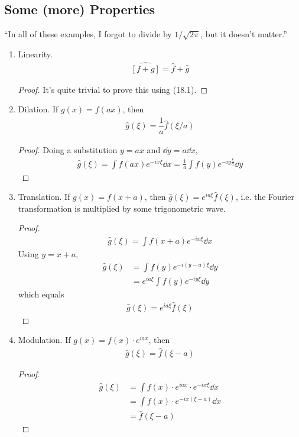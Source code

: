 \subsection{Some (more) Properties}
``In all of these examples, I forgot to divide by $1/\sqrt{2\pi}$, but it doesn't matter.''
\begin{enumerate}
    \item Linearity.
    \begin{align}
        \widehat{\left[f + g\right]} = \widehat{f} + \widehat{g}
    \end{align}
    \begin{proof}
        It's quite trivial to prove this using (18.1).
    \end{proof}
    \item Dilation. If $g(x) = f(ax)$, then
    \begin{align}
        \hat{g}(\xi) = \dfrac{1}{a} \hat{f}(\xi/a)
    \end{align}
    \begin{proof}
        Doing a substitution $y = ax$ and $\dd{y} = a\dd{x}$,
        \begin{align}
            \hat{g}(\xi) = \int f(ax) e^{-ix \xi} \dd{x} = \frac{1}{a}\int f(y) e^{-iy \frac{\xi}{a}} \dd{y}
        \end{align}
    \end{proof}
    \item Translation. If $g(x) = f(x+a)$, then $\hat{g}(\xi) = e^{ia\xi} \hat{f}(\xi)$, i.e. the Fourier transformation is multiplied by some trigonometric wave.
    \begin{proof}
        \begin{align}
            \hat{g}(\xi) = \int f(x+a) e^{-ix \xi} \dd{x}
        \end{align}
        Using $y = x + a$,
        \begin{align}
            \hat{g}(\xi) &= \int f(y) e^{-i(y-a) \xi} \dd{y}\\
            &= e^{ia\xi} \int f(y) e^{-iy \xi} \dd{y}
        \end{align}
        which equals
        \begin{align}
            \hat{g}(\xi) = e^{ia\xi} \hat{f}(\xi)
        \end{align}
    \end{proof}
    \item Modulation. If $g(x) = f(x) \cdot e^{iax}$, then
    \begin{align}
        \hat{g}(\xi) = \hat{f}(\xi - a)
    \end{align}
    \begin{proof}
        \begin{align}
            \hat{g}(\xi) &= \int f(x) \cdot e^{iax} \cdot e^{-ix\xi} \dd{x}\\
            &= \int f(x) \cdot e^{-ix(\xi-a)} \dd{x}\\
            &= \hat{f}(\xi - a)
        \end{align}        
    \end{proof}
\end{enumerate}

